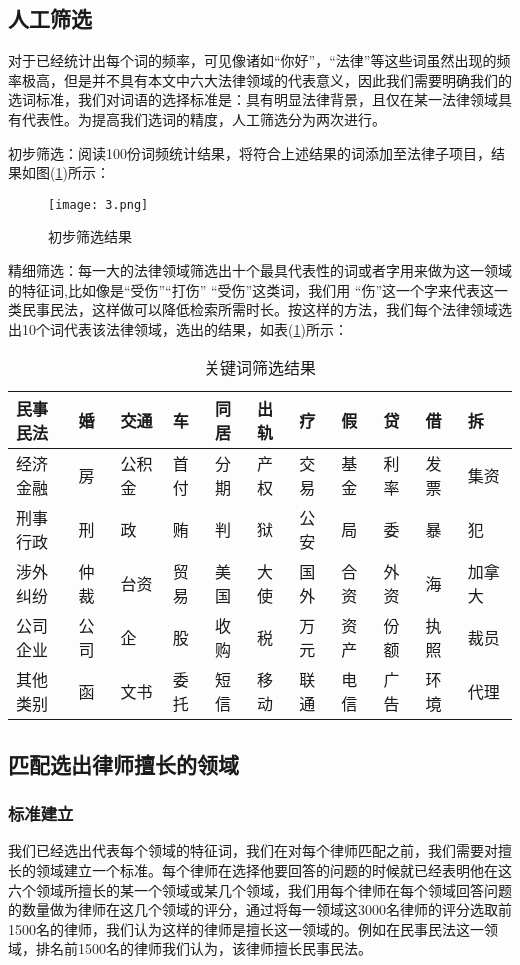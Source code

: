 \documentclass[bwprint]{cumcmthesis}
\begin{document}
\subsection{人工筛选}
对于已经统计出每个词的频率，可见像诸如“你好”，“法律”等这些词虽然出现的频率极高，但是并不具有本文中六大法律领域的代表意义，因此我们需要明确我们的选词标准，我们对词语的选择标准是：具有明显法律背景，且仅在某一法律领域具有代表性。为提高我们选词的精度，人工筛选分为两次进行。

初步筛选：阅读100份词频统计结果，将符合上述结果的词添加至法律子项目，结果如图(\ref{初步筛选结果})所示：

\begin{figure}[!htp]
\centering
\texttt{[image: 3.png]}
\caption{初步筛选结果}
\label{初步筛选结果}
\end{figure}

精细筛选：每一大的法律领域筛选出十个最具代表性的词或者字用来做为这一领域的特征词,比如像是“受伤”“打伤” “受伤”这类词，我们用 “伤”这一个字来代表这一类民事民法，这样做可以降低检索所需时长。按这样的方法，我们每个法律领域选出10个词代表该法律领域，选出的结果，如表(\ref{关键词筛选结果})所示：

\begin{table}[!htp]
\center
\caption{关键词筛选结果}
\label{关键词筛选结果}
    \begin{tabular}{|l|l|l|l|l|l|l|l|l|l|l|}
    \hline
    民事民法 & 婚  & 交通  & 车  & 同居 & 出轨  & 疗  & 假  & 贷  & 借  & 拆   \\ \hline
    经济金融 & 房  & 公积金 & 首付 & 分期 & 产权  & 交易 & 基金 & 利率 & 发票 & 集资  \\ \hline
    刑事行政 & 刑  & 政   & 贿  & 判  & 狱   & 公安 & 局  & 委  & 暴  & 犯   \\ \hline
    涉外纠纷 & 仲裁 & 台资  & 贸易 & 美国 & 大使  & 国外 & 合资 & 外资 & 海  & 加拿大 \\ \hline
    公司企业 & 公司 & 企   & 股  & 收购 & 税   & 万元 & 资产 & 份额 & 执照 & 裁员  \\ \hline
    其他类别 & 函  & 文书  & 委托 & 短信 & 移动  & 联通 & 电信 & 广告 & 环境 & 代理  \\ \hline
    \end{tabular}
\end{table}

\subsection{匹配选出律师擅长的领域}
\subsubsection{标准建立}
我们已经选出代表每个领域的特征词，我们在对每个律师匹配之前，我们需要对擅长的领域建立一个标准。每个律师在选择他要回答的问题的时候就已经表明他在这六个领域所擅长的某一个领域或某几个领域，我们用每个律师在每个领域回答问题的数量做为律师在这几个领域的评分，通过将每一领域这3000名律师的评分选取前1500名的律师，我们认为这样的律师是擅长这一领域的。例如在民事民法这一领域，排名前1500名的律师我们认为，该律师擅长民事民法。
\end{document}
